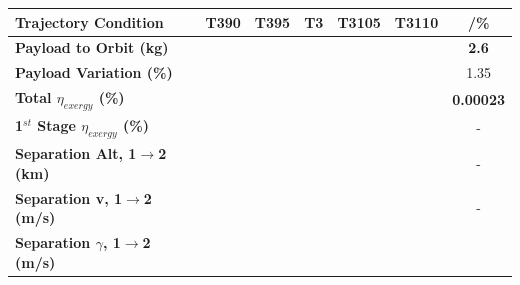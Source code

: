 \begin{table}[ht]
	\centering
	\begin{tabular}{l c c c c c c} 
		\hline \textbf{Trajectory Condition}
		&T390
		&T395
		&T3
		&T3105
		&T3110
		& /\%
		\\
		\hline \textbf{Payload to Orbit (kg)}
		& \textbf{\PayloadToOrbitTThreeNinetyNoReturn}
		& \textbf{\PayloadToOrbitTThreeNinetyFiveNoReturn}
		& \textbf{\PayloadToOrbitTThreeStandardNoReturn}
		& \textbf{\PayloadToOrbitTThreeOneHundredFiveNoReturn}
		& \textbf{\PayloadToOrbitTThreeOneHundredTenNoReturn}
		&\textbf{2.6}
		\\
		\textbf{Payload Variation (\%)}
		& \PayloadVarTThreeNinetyNoReturn
		& \PayloadVarTThreeNinetyFiveNoReturn
		& \PayloadVarTThreeStandardNoReturn
		& \PayloadVarTThreeOneHundredFiveNoReturn
		& \PayloadVarTThreeOneHundredTenNoReturn
		&1.35
		\\
		\textbf{Total $\eta_{exergy}$ (\%)}
		& \textbf{\totalExergyEffTThreeNinetyNoReturn}
		& \textbf{\totalExergyEffTThreeNinetyFiveNoReturn}
		& \textbf{\totalExergyEffTThreeStandardNoReturn}
		& \textbf{\totalExergyEffTThreeOneHundredFiveNoReturn}
		& \textbf{\totalExergyEffTThreeOneHundredTenNoReturn}
		& \textbf{0.00023}
		\\
		\hline 
		\textbf{1$^{st}$ Stage $\eta_{exergy}$ (\%)}
		& \textbf{\firstExergyEffTThreeNinetyNoReturn}
		& \textbf{\firstExergyEffTThreeNinetyFiveNoReturn}
		& \textbf{\firstExergyEffTThreeStandardNoReturn}
		& \textbf{\firstExergyEffTThreeOneHundredFiveNoReturn}
		& \textbf{\firstExergyEffTThreeOneHundredTenNoReturn}
		& -
		\\
		\textbf{Separation Alt, 1$\rightarrow$2 (km)}
		& \firstsecondSeparationAltTThreeNinetyNoReturn
		& \firstsecondSeparationAltTThreeNinetyFiveNoReturn
		& \firstsecondSeparationAltTThreeStandardNoReturn
		& \firstsecondSeparationAltTThreeOneHundredFiveNoReturn
		& \firstsecondSeparationAltTThreeOneHundredTenNoReturn
		& -
		\\
		\textbf{Separation v, 1$\rightarrow$2 (m/s)}
		& \firstsecondSeparationvTThreeNinetyNoReturn
		& \firstsecondSeparationvTThreeNinetyFiveNoReturn
		& \firstsecondSeparationvTThreeStandardNoReturn
		& \firstsecondSeparationvTThreeOneHundredFiveNoReturn
		& \firstsecondSeparationvTThreeOneHundredTenNoReturn
		& -
		\\
		\textbf{Separation $\gamma$, 1$\rightarrow$2 (m/s)}
		& \firstsecondSeparationgammaTThreeNinetyNoReturn
		& \firstsecondSeparationgammaTThreeNinetyFiveNoReturn
		& \firstsecondSeparationgammaTThreeStandardNoReturn

\end{tabular}
\end{table}
